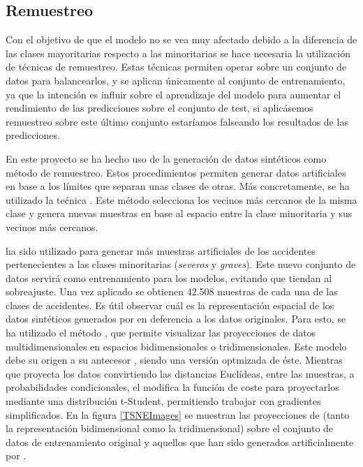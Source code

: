         \subsection{Remuestreo}


            Con el objetivo de que el modelo no se vea muy afectado debido a la diferencia de las clases mayoritarias respecto a las minoritarias se hace necesaria la utilización de técnicas de remuestreo. Estas técnicas permiten operar sobre un conjunto de datos para balancearlos, y se aplican únicamente al conjunto de entrenamiento, ya que la intención  es influir sobre el aprendizaje del modelo para aumentar el rendimiento de las predicciones sobre el conjunto de test, si aplicásemos remuestreo sobre este último conjunto estaríamos falseando los resultados de las predicciones.


            En este proyecto se ha hecho uso de la generación de datos sintéticos como método de remuestreo. Estos procedimientos permiten generar datos artificiales en base a los límites que separan unas clases de otras. Más concretamente, se ha utilizado la tećnica  \cite{SMOTEII}. Este método selecciona los vecinos más cercanos de la misma clase y genera nuevas muestras en base al espacio entre la clase minoritaria y sus vecinos más cercanos.

             ha sido utilizado para generar más muestras artificiales de los accidentes pertenecientes a las clases minoritarias (\textit{severos} y \textit{graves}). Este nuevo conjunto de datos servirá como entrenamiento para los modelos, evitando que tiendan al sobreajuste. Una vez aplicado  se obtienen 42.508 muestras de cada una de las clases de accidentes. Es útil observar cuál es la representación espacial de los datos sintéticos generados por  en deferencia a los datos originales. Para esto, se ha utilizado el método  \cite{TSNEPaper}, que permite visualizar las proyecciones de datos multidimensionales en espacios bidimensionales o tridimensionales. Este modelo debe su origen a su antecesor , siendo una versión optmizada de éste. Mientras que  proyecta los datos convirtiendo las distancias Euclídeas, entre las muestras, a probabilidades condicionales, el  modifica la función de coste para proyectarlos mediante una distribución t-Student, permitiendo trabajar con gradientes simplificados. En la figura \eqref{TSNEImages} se muestran las proyecciones de  (tanto la representación bidimensional como la tridimensional) sobre el conjunto de datos de entrenamiento original y aquellos que han sido generados artificialmente por .

